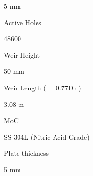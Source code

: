 \documentclass[a4paper,portrait,12pt]{article}
\begin{document}
\begin{flushleft}
5 mm
\end{flushleft}





\begin{flushleft}
Active Holes
\end{flushleft}





48600





\begin{flushleft}
Weir Height
\end{flushleft}





\begin{flushleft}
50 mm
\end{flushleft}





\begin{flushleft}
Weir Length ( = 0.77Dc )
\end{flushleft}





\begin{flushleft}
3.08 m
\end{flushleft}





\begin{flushleft}
MoC
\end{flushleft}





\begin{flushleft}
SS 304L (Nitric Acid Grade)
\end{flushleft}





\begin{flushleft}
Plate thickness
\end{flushleft}





\begin{flushleft}
5 mm
\end{flushleft}
\end{document}
